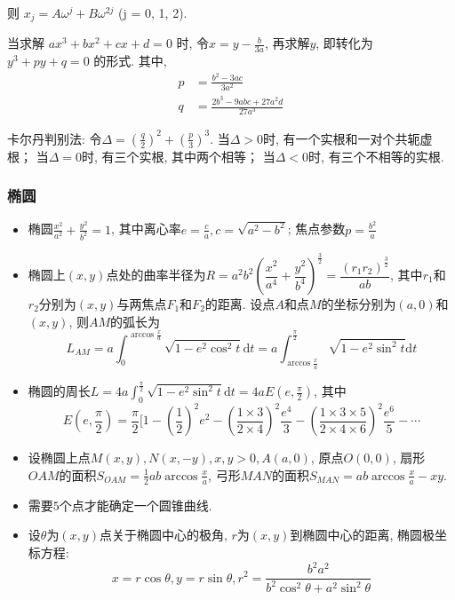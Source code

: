 \documentclass[landscape, twocolumn, 8pt, a4paper, twoside]{extarticle}
\begin{document}
      则 $x_j = A\omega^{j} + B\omega^{2j}$ (j = 0, 1, 2).
      
      当求解 $ax ^ 3 + bx ^ 2 + cx + d = 0$ 时, 令$x = y - \frac{b}{3a}$, 再求解$y$, 即转化为$y^3 + py + q = 0$ 的形式. 
      其中, 
      \begin{align*}
        p &= \frac{b^2 - 3ac}{3a^2} \\
        q &= \frac{2b ^ 3 - 9 abc + 27 a ^ 2 d}{27 a ^ 3}
      \end{align*}

      卡尔丹判别法: 
      令$\Delta = (\frac{q}{2}) ^ 2 + (\frac{p}{3}) ^ 3$. 
      当$\Delta > 0$时, 有一个实根和一对个共轭虚根；
      当$\Delta = 0$时, 有三个实根, 其中两个相等；
      当$\Delta < 0$时, 有三个不相等的实根. 
    
    \subsubsection{椭圆}
    \begin{itemize}
    \item 椭圆$\frac{x^2}{a^2} + \frac{y^2}{b^2} = 1$, 其中离心率$e = \frac{c}{a}, c = \sqrt{a^2 - b^2}$; 焦点参数$p = \frac{b^2}{a}$
    \item 椭圆上$(x, y)$点处的曲率半径为$R = a^2 b^2 (\dfrac{x^2}{a^4} + \dfrac{y^2}{b^4})^\frac{3}{2} = \dfrac{(r_1 r_2)^\frac{3}{2}}{ab}$, 其中$r_1$和$r_2$分别为$(x, y)$与两焦点$F_1$和$F_2$的距离. 设点$A$和点$M$的坐标分别为$(a, 0)$和$(x, y)$, 则$AM$的弧长为
    \[ L_{AM} = a \int_0^{\arccos{\frac{x}{a} }} \sqrt{1 - e^2 \cos^2 t} \textrm{d} t = a \int_{\arccos{\frac{x}{a} }}^\frac{\pi}{2} \sqrt{1 - e^2 \sin^2 t} \textrm{d} t\]
    \item 椭圆的周长$L = 4a \int_0^{\frac{\pi}{2}} \sqrt{1 - e^2 \sin^2 t } \textrm{d} t = 4a E(e, \frac{\pi}{2})$, 其中
    \[ E(e, \frac{\pi}{2}) = \frac{\pi}{2} [ 1 - (\frac{1}{2})^2 e^2 - (\frac{1 \times 3}{2 \times 4})^2 \frac{e^4}{3} - (\frac{1 \times 3 \times 5}{2 \times 4 \times 6})^2 \frac{e^6}{5} - \cdots\]
    \item 设椭圆上点$M(x, y), N(x, -y), x, y > 0, A(a, 0)$, 原点$O(0, 0)$, 扇形$OAM$的面积$S_{OAM} = \frac{1}{2} ab \arccos{\frac{x}{a}}$, 弓形$MAN$的面积$S_{MAN} = ab \arccos{\frac{x}{a}} - xy$.
    \item 需要$5$个点才能确定一个圆锥曲线.
    \item 设$\theta$为$(x, y)$点关于椭圆中心的极角, $r$为$(x, y)$到椭圆中心的距离, 椭圆极坐标方程:
    \[ x = r \cos \theta, y = r \sin \theta, r^2 = \frac{b^2 a^2}{b^2 \cos^2 \theta + a^2 \sin^2 \theta}\]
  \end{itemize}
  
\end{document}
